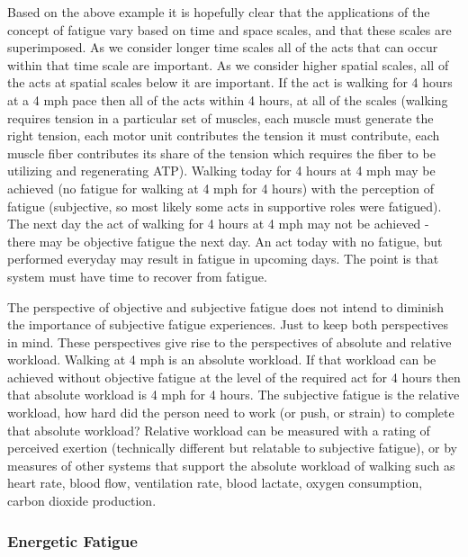 Based on the above example it is hopefully clear that the applications of the concept of fatigue vary based on time and space scales, and that these scales are superimposed. As we consider longer time scales all of the acts that can occur within that time scale are important. As we consider higher spatial scales, all of the acts at spatial scales below it are important. If the act is walking for 4 hours at a 4 mph pace then all of the acts within 4 hours, at all of the scales (walking requires tension in a particular set of muscles, each muscle must generate the right tension, each motor unit contributes the tension it must contribute, each muscle fiber contributes its share of the tension which requires the fiber to be utilizing and regenerating ATP). Walking today for 4 hours at 4 mph may be achieved (no fatigue for walking at 4 mph for 4 hours) with the perception of fatigue (subjective, so most likely some acts in supportive roles were fatigued). The next day the act of walking for 4 hours at 4 mph may not be achieved - there may be objective fatigue the next day. An act today with no fatigue, but performed everyday may result in fatigue in upcoming days. The point is that system must have time to recover from fatigue.

The perspective of objective and subjective fatigue does not intend to diminish the importance of subjective fatigue experiences. Just to keep both perspectives in mind. These perspectives give rise to the perspectives of absolute and relative workload. Walking at 4 mph is an absolute workload. If that workload can be achieved without objective fatigue at the level of the required act for 4 hours then that absolute workload is 4 mph for 4 hours. The subjective fatigue is the relative workload, how hard did the person need to work (or push, or strain) to complete that absolute workload? Relative workload can be measured with a rating of perceived exertion (technically different but relatable to subjective fatigue), or by measures of other systems that support the absolute workload of walking such as heart rate, blood flow, ventilation rate, blood lactate, oxygen consumption, carbon dioxide production. 

\subsubsection{Energetic Fatigue}

